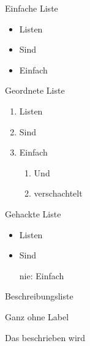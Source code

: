 \documentclass[a4paper]{amsart}
\begin{document}
Einfache Liste

\begin{itemize}
    \item Listen
    \item Sind
    \item Einfach
\end{itemize}
  

Geordnete Liste

\begin{enumerate}
    \item Listen
    \item Sind
    \item Einfach
    \begin{enumerate}
        \item Und
        \item verschachtelt
    \end{enumerate}
\end{enumerate}

Gehackte Liste
\begin{itemize}
    \item Listen
    \item Sind
    \item[nie:] Einfach
\end{itemize}

Beschreibungsliste

\begin{description}
    \item Ganz ohne Label
    \item[Mit Label] Das beschrieben wird
 \end{description}
\end{document}
